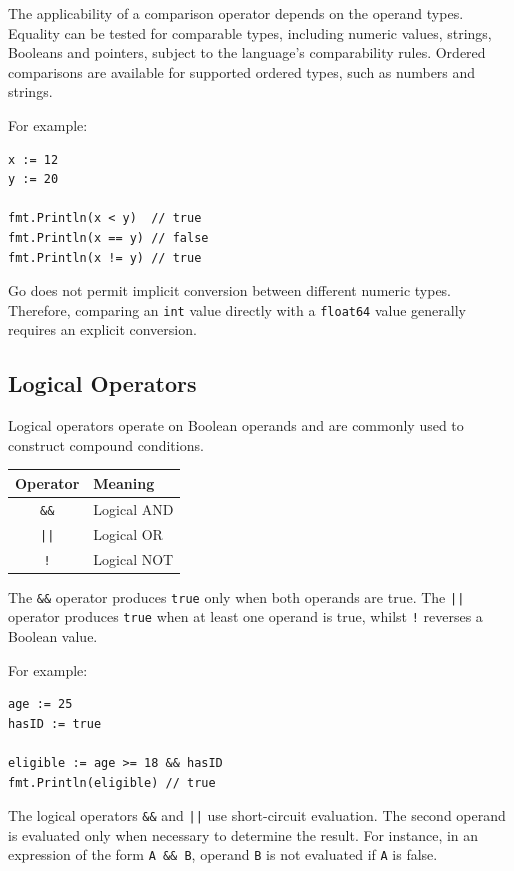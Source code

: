The applicability of a comparison operator depends on the
operand types. Equality can be tested for comparable types,
including numeric values, strings, Booleans and pointers,
subject to the language's comparability rules. Ordered
comparisons are available for supported ordered types, such
as numbers and strings.

For example:

\begin{lstlisting}
x := 12
y := 20

fmt.Println(x < y)  // true
fmt.Println(x == y) // false
fmt.Println(x != y) // true
\end{lstlisting}

Go does not permit implicit conversion between different
numeric types. Therefore, comparing an \texttt{int} value
directly with a \texttt{float64} value generally requires an
explicit conversion.

\subsection{Logical Operators}

Logical operators operate on Boolean operands and are commonly
used to construct compound conditions.

\begin{center}
\begin{tabular}{|c|l|}
\hline
\textbf{Operator} & \textbf{Meaning} \\
\hline
\texttt{\&\&} & Logical AND \\
\texttt{||} & Logical OR \\
\texttt{!} & Logical NOT \\
\hline
\end{tabular}
\end{center}

The \texttt{\&\&} operator produces \texttt{true} only when
both operands are true. The \texttt{||} operator produces
\texttt{true} when at least one operand is true, whilst
\texttt{!} reverses a Boolean value.

For example:

\begin{lstlisting}
age := 25
hasID := true

eligible := age >= 18 && hasID
fmt.Println(eligible) // true
\end{lstlisting}

The logical operators \texttt{\&\&} and \texttt{||} use
short-circuit evaluation. The second operand is evaluated only
when necessary to determine the result. For instance, in an
expression of the form \texttt{A \&\& B}, operand \texttt{B}
is not evaluated if \texttt{A} is false.

